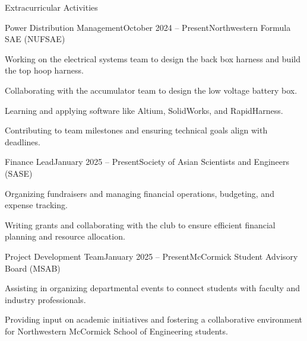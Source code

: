 \documentclass[
	a4paper, %
	9pt, %
]{resume} %
\begin{document}

\begin{rSection}{Extracurricular Activities}
    \begin{rSubsection}{Power Distribution Management}{October 2024 -- Present}{Northwestern Formula SAE (NUFSAE)}{}{}
    	\item Working on the electrical systems team to design the back box harness and build the top hoop harness.
    	\item Collaborating with the accumulator team to design the low voltage battery box.
        	\item Learning and applying software like Altium, SolidWorks, and RapidHarness.
        	\item Contributing to team milestones and ensuring technical goals align with deadlines.
    \end{rSubsection}

\begin{rSubsection}{Finance Lead}{January 2025 -- Present}{Society of Asian Scientists and Engineers (SASE)}{}
	\item Organizing fundraisers and managing financial operations, budgeting, and expense tracking.
    \item Writing grants and collaborating with the club to ensure efficient financial planning and resource allocation.
    \end{rSubsection}

    \begin{rSubsection}{Project Development Team}{January 2025 -- Present}{McCormick Student Advisory Board (MSAB)}{}{}
        	\item Assisting in organizing departmental events to connect students with faculty and industry professionals.
        	\item Providing input on academic initiatives and fostering a collaborative environment for Northwestern McCormick School of Engineering  students.
    \end{rSubsection}


\end{rSection}
\end{document}
